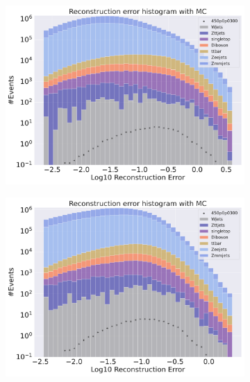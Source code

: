 \begin{figure}[H]
    \centering
    \begin{subfigure}{.45\textwidth}
        \includegraphics[width=\textwidth]{Figures/VAE_testing/big/2lep/b_data_recon_big_rm3_feats_sig_450p0p0300_.pdf}
        \caption{ }
        \label{fig:VAE_2lep_big_450}
    \end{subfigure}
    \hfill
    \begin{subfigure}{.45\textwidth}
        \includegraphics[width=\textwidth]{Figures/VAE_testing/small/2lep/b_data_recon_big_rm3_feats_sig_450p0p0300_.pdf}
        \caption{}
        \label{fig:VAE_2lep_small_450}
    \end{subfigure}
    \hfill
    \begin{subfigure}{.45\textwidth}

\end{subfigure}
\end{figure}
